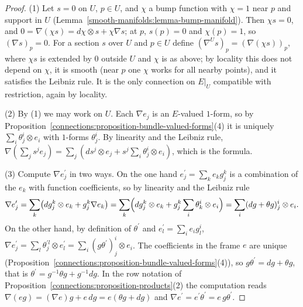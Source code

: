 \begin{proof}
(1) Let $s = 0$ on $U$, $p \in U$, and $\chi$ a bump function with $\chi = 1$ near $p$ and support in $U$ (Lemma~\ref{smooth-manifolds:lemma-bump-manifold}). Then $\chi s = 0$, and
$0 = \nabla(\chi s) = d\chi \otimes s + \chi\nabla s$; at $p$, $s(p) = 0$ and $\chi(p) = 1$, so $(\nabla s)_p = 0$. For a section $s$ over $U$ and $p \in U$ define
$(\nabla^Us)_p = (\nabla(\chi s))_p$, where $\chi s$ is extended by $0$ outside $U$ and $\chi$ is as above; by locality this does not depend on $\chi$, it is smooth (near $p$ one
$\chi$ works for all nearby points), and it satisfies the Leibniz rule. It is the only connection on $E|_U$ compatible with restriction, again by locality.

(2) By (1) we may work on $U$. Each $\nabla e_j$ is an $E$-valued $1$-form, so by Proposition~\ref{connections:proposition-bundle-valued-forms}(4) it is uniquely
$\sum_i\theta^i_j \otimes e_i$ with $1$-forms $\theta^i_j$. By linearity and the Leibniz rule,
$\nabla(\sum_js^je_j) = \sum_j(ds^j \otimes e_j + s^j\sum_i\theta^i_j \otimes e_i)$, which is the formula.

(3) Compute $\nabla e^{\prime}_j$ in two ways. On the one hand $e^{\prime}_j = \sum_ke_kg^k_j$ is a combination of the $e_k$ with function coefficients, so by linearity and the Leibniz rule
\[
\nabla e^{\prime}_j = \sum_k\bigl(dg^k_j \otimes e_k + g^k_j\nabla e_k\bigr) = \sum_k\Bigl(dg^k_j \otimes e_k + g^k_j\sum_i\theta^i_k \otimes e_i\Bigr) = \sum_i(dg + \theta g)^i_j \otimes e_i .
\]
On the other hand, by definition of $\theta^{\prime}$ and $e^{\prime}_l = \sum_ie_ig^i_l$, $\nabla e^{\prime}_j = \sum_l\theta^{\prime l}_j \otimes e^{\prime}_l = \sum_i(g\theta^{\prime})^i_j \otimes e_i$. The coefficients in the
frame $e$ are unique (Proposition~\ref{connections:proposition-bundle-valued-forms}(4)), so $g\theta^{\prime} = dg + \theta g$, that is $\theta^{\prime} = g^{-1}\theta g + g^{-1}dg$. In the row notation of
Proposition~\ref{connections:proposition-products}(2) the computation reads $\nabla(eg) = (\nabla e)g + e\,dg = e(\theta g + dg)$ and $\nabla e^{\prime} = e^{\prime}\theta^{\prime} = e\,g\theta^{\prime}$.


\end{proof}
